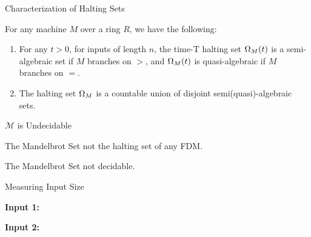 \documentclass[c]{beamer}
\begin{document}

\begin{frame}{Characterization of Halting Sets}

  \begin{theorem}
    
    For any machine $M$ over a ring $R$, we have the following:

    \begin{enumerate}
    \item For any $t > 0$, for inputs of length $n$, the time-T
      halting set $\Omega_M(t)$ is a semi-algebraic set if $M$
      branches on $>$, and $\Omega_M(t)$ is quasi-algebraic if $M$
      branches on $=$.

    \item The halting set $\Omega_M$ is a countable union of
      disjoint semi(quasi)-algebraic sets.
    \end{enumerate}
  \end{theorem}
\end{frame}

\begin{frame}{$\mathcal{M}$ is Undecidable}
  
  \begin{corollary}
    The Mandelbrot Set not the halting set of any FDM.
  \end{corollary}

  \begin{corollary}
    The Mandelbrot Set not decidable.
  \end{corollary}
  
\end{frame}

\begin{frame}{Measuring Input Size}

  \begin{center}
    \textbf{Input 1:}
  \end{center}

  \begin{center}
    \textbf{Input 2:}
  \end{center}

\end{frame}
\end{document}

